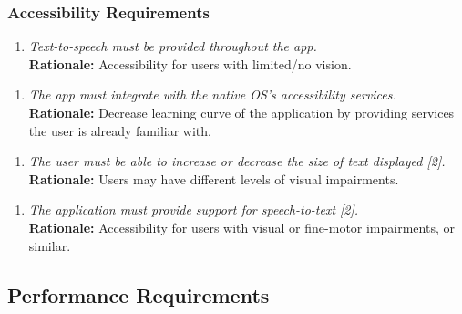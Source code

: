 \documentclass[]{article}
\begin{document}
\begin{enumerate}[{\bf BE1.}]
\subsubsection{Accessibility Requirements}
\label{ssub:accessibility_requirements}
\begin{enumerate}[{UH-A}1. ]
    \item \emph{Text-to-speech must be provided throughout the app.}\\
        {\bf Rationale:} Accessibility for users with limited/no vision.
\end{enumerate}
\begin{enumerate}[{UH-A}2. ]
    \item \emph{The app must integrate with the native OS’s accessibility services.}\\
        {\bf Rationale:} Decrease learning curve of the application by providing services the user is already familiar with.
\end{enumerate}
\begin{enumerate}[{UH-A}3. ]
    \item \emph{The user must be able to increase or decrease the size of text displayed [2].}\\
        {\bf Rationale:} Users may have different levels of visual impairments.
\end{enumerate}
\begin{enumerate}[{UH-A}4. ]
    \item \emph{The application must provide support for speech-to-text [2].}\\
        {\bf Rationale:} Accessibility for users with visual or fine-motor impairments, or similar.
\end{enumerate}




\subsection{Performance Requirements}
\label{sub:performance_requirements}



\end{enumerate}
\end{document}
